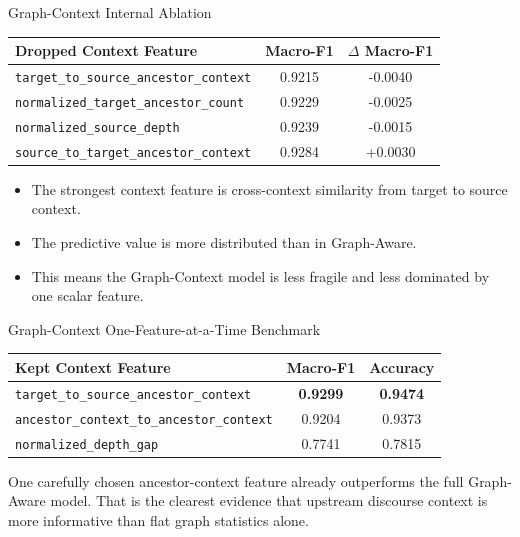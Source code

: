 \documentclass[aspectratio=169, 10pt]{beamer}
\newcommand{\takeawaybox}[2]{%
  \begin{tcolorbox}[colback=accentgreen!10, colframe=accentgreen,
    title={\textbf{Takeaway:} #1}, fonttitle=\bfseries\small,
    left=4pt, right=4pt, top=3pt, bottom=3pt, boxrule=1pt]
    \small #2
  \end{tcolorbox}}
\begin{document}
\begin{frame}{Graph-Context Internal Ablation}
\begin{center}
\begin{tabular}{lcc}
\toprule
Dropped Context Feature & Macro-F1 & \(\Delta\) Macro-F1 \\
\midrule
\texttt{target\_to\_source\_ancestor\_context} & 0.9215 & -0.0040 \\
\texttt{normalized\_target\_ancestor\_count} & 0.9229 & -0.0025 \\
\texttt{normalized\_source\_depth} & 0.9239 & -0.0015 \\
\texttt{source\_to\_target\_ancestor\_context} & 0.9284 & +0.0030 \\
\bottomrule
\end{tabular}
\end{center}

\begin{itemize}
  \item The strongest context feature is cross-context similarity from target to source context.
  \item The predictive value is more distributed than in Graph-Aware.
  \item This means the Graph-Context model is less fragile and less dominated by one scalar feature.
\end{itemize}
\end{frame}

\begin{frame}{Graph-Context One-Feature-at-a-Time Benchmark}
\begin{center}
\begin{tabular}{lcc}
\toprule
Kept Context Feature & Macro-F1 & Accuracy \\
\midrule
\texttt{target\_to\_source\_ancestor\_context} & \textbf{0.9299} & \textbf{0.9474} \\
\texttt{ancestor\_context\_to\_ancestor\_context} & 0.9204 & 0.9373 \\
\texttt{normalized\_depth\_gap} & 0.7741 & 0.7815 \\
\bottomrule
\end{tabular}
\end{center}

\takeawaybox{Main Finding}{
One carefully chosen ancestor-context feature already outperforms the full Graph-Aware model. That is the clearest evidence that upstream discourse context is more informative than flat graph statistics alone.
}
\end{frame}
\end{document}
